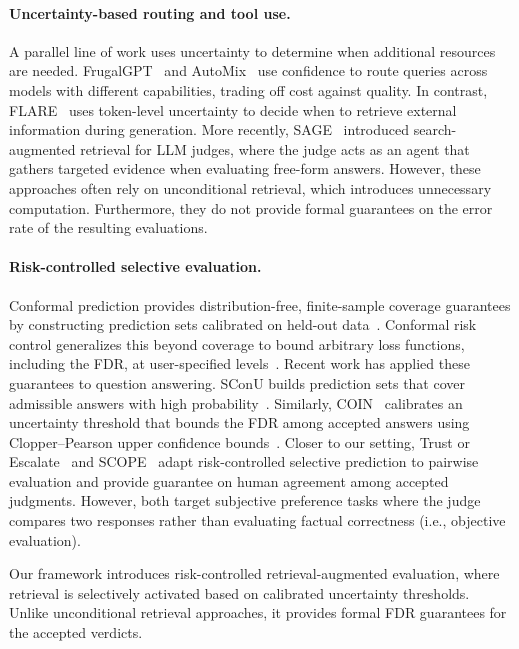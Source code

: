 \paragraph{Uncertainty-based routing and tool use.}
A parallel line of work uses uncertainty to determine when additional resources are needed. FrugalGPT~\citep{chen2023frugalgptuselargelanguage} and AutoMix~\citep{NEURIPS2024_ecda225c} use confidence to route queries across models with different capabilities, trading off cost against quality. In contrast, FLARE~\citep{jiang-etal-2023-active} uses token-level uncertainty to decide when to retrieve external information during generation. More recently, SAGE~\citep{tale_sb} introduced search-augmented retrieval for LLM judges, where the judge acts as an agent that gathers targeted evidence when evaluating free-form answers. However, these approaches often rely on unconditional retrieval, which introduces unnecessary computation. Furthermore, they do not provide formal guarantees on the error rate of the resulting evaluations.

\paragraph{Risk-controlled selective evaluation.}
Conformal prediction provides distribution-free, finite-sample coverage guarantees by constructing prediction sets calibrated on held-out data~\citep{angelopoulos2023gentle}. Conformal risk control generalizes this beyond coverage to bound arbitrary loss functions, including the FDR, at user-specified levels~\citep{angelopoulos2024conformal}. Recent work has applied these guarantees to question answering. SConU builds prediction sets that cover admissible answers with high probability~\citep{wang-etal-2025-sconu}. Similarly, COIN~\citep{wang2025coin} calibrates an uncertainty threshold that bounds the FDR among accepted answers using Clopper--Pearson upper confidence bounds~\citep{be7c0fd0_cp}. Closer to our setting, Trust or Escalate~\citep{jung2025trust} and SCOPE~\citep{scope} adapt risk-controlled selective prediction to pairwise evaluation and provide guarantee on human agreement among accepted judgments. However, both target subjective preference tasks where the judge compares two responses rather than evaluating factual correctness (i.e., objective evaluation).

Our framework introduces risk-controlled retrieval-augmented evaluation, where retrieval is selectively activated based on calibrated uncertainty thresholds. Unlike unconditional retrieval approaches, it provides formal FDR guarantees for the accepted verdicts.